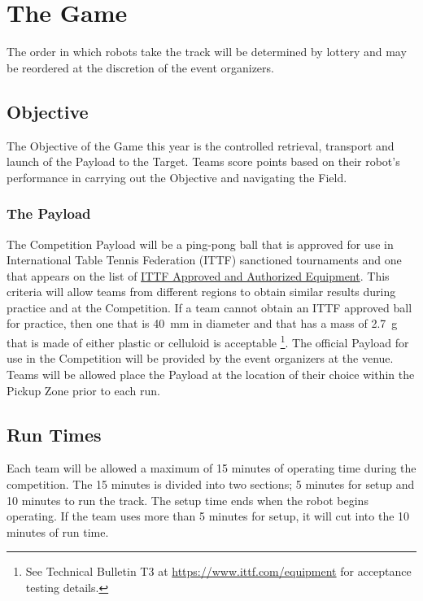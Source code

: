 \section{The Game}
The order in which robots take the track will be determined by lottery and may be reordered at the discretion of the event organizers. 

\subsection{Objective}
The Objective of the Game this year is the controlled retrieval, transport and launch of the Payload to the Target. \iffalse During a run the Payload must be under the control of the robot at all times during its journey to the Launch. \fi Teams score points based on their robot’s performance in carrying out the Objective and navigating the Field.

\subsubsection{The Payload}
The Competition Payload will be a ping-pong ball that is approved for use in International Table Tennis Federation (ITTF) sanctioned tournaments and one that appears on the list of \href{https://www.ittf.com/equipment/}{ITTF Approved and Authorized Equipment}. This criteria will allow teams from different regions to obtain similar results during practice and at the Competition. If a team cannot obtain an ITTF approved ball for practice, then one that is \SI{40}{\milli\metre} in diameter and that has a mass of \SI{2.7}{\gram} that is made of either plastic or celluloid is acceptable \footnote{See Technical Bulletin T3 at \url{https://www.ittf.com/equipment} for acceptance testing details.}. The official Payload for use in the Competition will be provided by the event organizers at the venue. Teams will be allowed place the Payload at the location of their choice within the Pickup Zone prior to each run.

\subsection{Run Times}
Each team will be allowed a maximum of 15 minutes of operating time during the competition. The 15 minutes is divided into two sections; 5 minutes for setup and 10 minutes to run the track. The setup time ends when the robot begins operating. If the team uses more than 5 minutes for setup, it will cut into the 10 minutes of run time. 

